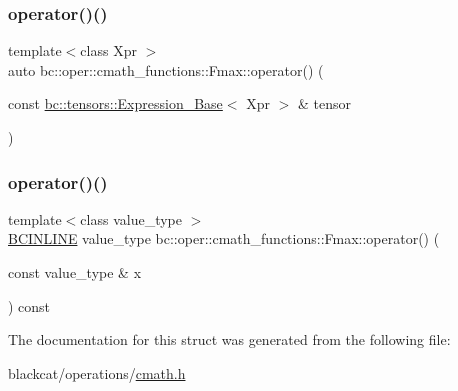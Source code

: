\mbox{\label{structbc_1_1oper_1_1cmath__functions_1_1Fmax_af40c7a7b82d87f89fcfd4dfecfff4ce7}} 
\subsubsection{\texorpdfstring{operator()()}{operator()()}\hspace{0.1cm}{\footnotesize\ttfamily [2/3]}}
{\footnotesize\ttfamily template$<$class Xpr $>$ \\
auto bc\+::oper\+::cmath\+\_\+functions\+::\+Fmax\+::operator() (\begin{DoxyParamCaption}\item[{const \hyperlink{classbc_1_1tensors_1_1Expression__Base}{bc\+::tensors\+::\+Expression\+\_\+\+Base}$<$ Xpr $>$ \&}]{tensor }\end{DoxyParamCaption})\hspace{0.3cm}{\ttfamily [inline]}}

\mbox{\label{structbc_1_1oper_1_1cmath__functions_1_1Fmax_aa76ab05e03975a0c42a3abcf50db4ed3}} 
\subsubsection{\texorpdfstring{operator()()}{operator()()}\hspace{0.1cm}{\footnotesize\ttfamily [3/3]}}
{\footnotesize\ttfamily template$<$class value\+\_\+type $>$ \\
\hyperlink{common_8h_a6699e8b0449da5c0fafb878e59c1d4b1}{B\+C\+I\+N\+L\+I\+NE} value\+\_\+type bc\+::oper\+::cmath\+\_\+functions\+::\+Fmax\+::operator() (\begin{DoxyParamCaption}\item[{const value\+\_\+type \&}]{x }\end{DoxyParamCaption}) const\hspace{0.3cm}{\ttfamily [inline]}}



The documentation for this struct was generated from the following file\+:\begin{DoxyCompactItemize}
\item 
blackcat/operations/\hyperlink{cmath_8h}{cmath.\+h}\end{DoxyCompactItemize}
